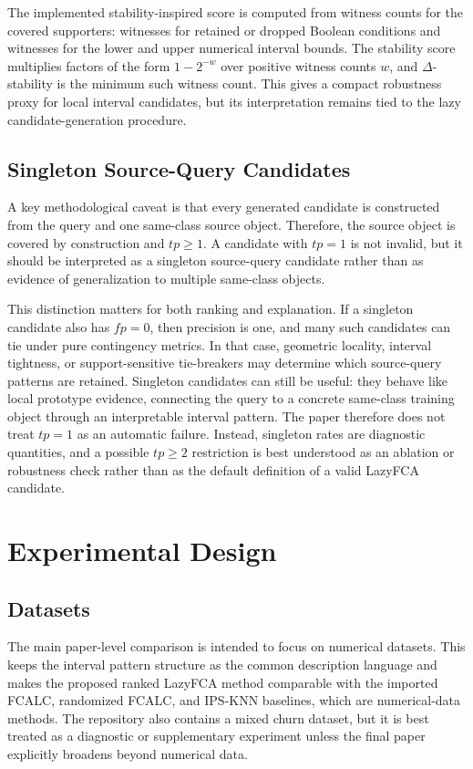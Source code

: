 \documentclass[11pt]{article}
\begin{document}
The implemented stability-inspired score is computed from witness counts for
the covered supporters: witnesses for retained or dropped Boolean conditions
and witnesses for the lower and upper numerical interval bounds. The
stability score multiplies factors of the form $1-2^{-w}$ over positive
witness counts $w$, and $\Delta$-stability is the minimum such witness count.
This gives a compact robustness proxy for local interval candidates, but its
interpretation remains tied to the lazy candidate-generation procedure.

\subsection{Singleton Source-Query Candidates}

A key methodological caveat is that every generated candidate is constructed
from the query and one same-class source object. Therefore, the source object is
covered by construction and $tp \geq 1$. A candidate with $tp=1$ is not invalid,
but it should be interpreted as a singleton source-query candidate rather than
as evidence of generalization to multiple same-class objects.

This distinction matters for both ranking and explanation. If a singleton
candidate also has $fp=0$, then precision is one, and many such candidates can
tie under pure contingency metrics. In that case, geometric locality,
interval tightness, or support-sensitive tie-breakers may determine which
source-query patterns are retained. Singleton candidates can still be useful:
they behave like local prototype evidence, connecting the query to a concrete
same-class training object through an interpretable interval pattern. The
paper therefore does not treat $tp=1$ as an automatic failure. Instead,
singleton rates are diagnostic quantities, and a possible $tp \geq 2$
restriction is best understood as an ablation or robustness check rather than
as the default definition of a valid LazyFCA candidate.

\section{Experimental Design}

\subsection{Datasets}

The main paper-level comparison is intended to focus on numerical datasets.
This keeps the interval pattern structure as the common description language
and makes the proposed ranked LazyFCA method comparable with the imported
FCALC, randomized FCALC, and IPS-KNN baselines, which are numerical-data
methods. The repository also contains a mixed churn dataset, but it is best
treated as a diagnostic or supplementary experiment unless the final paper
explicitly broadens beyond numerical data.
\end{document}
